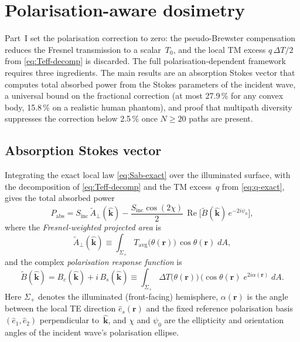 \documentclass[11pt,a4paper]{article}
\theoremstyle{definition}      %
\newcommand{\khat}{\hat{\bm{k}}}
\newcommand{\rr}{\mathbf{r}}
\newcommand{\Sinc}{S_{\mathrm{inc}}}
\newcommand{\Tavg}{T_{\mathrm{avg}}}
\DeclareMathOperator{\RE}{Re}
\begin{document}
\section{Polarisation-aware dosimetry}\label{sec:polarisation}

Part~I set the polarisation correction to zero:
the pseudo-Brewster compensation reduces the Fresnel transmission
to a scalar~$T_0$, and the local TM excess $q\,\Delta T/2$ from
\cref{eq:Teff-decomp} is discarded.  The full polarisation-dependent
framework requires three ingredients.  The main results are
an absorption Stokes vector that computes total absorbed power
from the Stokes parameters of the incident wave, a universal bound
on the fractional correction (at most 27.9\,\% for any convex body,
15.8\,\% on a realistic human phantom), and proof that multipath
diversity suppresses the correction below 2.5\,\% once $N\ge 20$
paths are present.

\subsection{Absorption Stokes vector}\label{sec:stokes-vector}

Integrating the exact local law \cref{eq:Sab-exact} over the
illuminated surface, with the decomposition of
\cref{eq:Teff-decomp} and the TM excess~$q$ from
\cref{eq:q-exact}, gives the total absorbed power
\begin{equation}\label{eq:Pabs-pol-full}
  P_{\mathrm{abs}}
  = \Sinc\,\tilde{A}_\perp(\khat)
  - \frac{\Sinc\cos(2\chi)}{2}\,
    \RE\!\bigl[\tilde{B}(\khat)\,e^{-2i\psi_0}\bigr],
\end{equation}
where the \emph{Fresnel-weighted projected area} is
\begin{equation}\label{eq:Atilde-def}
  \tilde{A}_\perp(\khat)
  \equiv \int_{\Sigma_+}
    \Tavg\!\bigl(\theta(\rr)\bigr)\,\cos\theta(\rr)\;dA,
\end{equation}
and the complex \emph{polarisation response function} is
\begin{equation}\label{eq:Btilde-def}
  \tilde{B}(\khat)
  = B_c(\khat) + i\,B_s(\khat)
  \equiv \int_{\Sigma_+}
    \Delta T\!\bigl(\theta(\rr)\bigr)\,(\cos\theta(\rr)\;
    e^{2i\alpha(\rr)}\;dA.
\end{equation}
Here $\Sigma_+$ denotes the illuminated (front-facing) hemisphere,
$\alpha(\rr)$ is the angle between the local TE direction
$\hat{e}_s(\rr)$ and the fixed reference polarisation basis
$(\hat{e}_1,\hat{e}_2)$ perpendicular to~$\khat$,
and $\chi$ and $\psi_0$ are the ellipticity and orientation angles
of the incident wave's polarisation ellipse.
\end{document}
